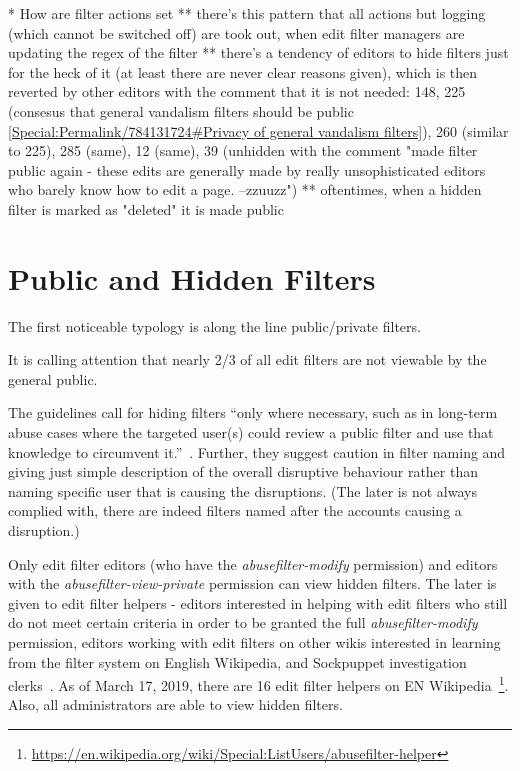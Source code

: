 * How are filter actions set
  ** there's this pattern that all actions but logging (which cannot be switched off) are took out, when edit filter managers are updating the regex of the filter
  ** there's a tendency of editors to hide filters just for the heck of it (at least there are never clear reasons given), which is then reverted by other editors with the comment that it is not needed: 148, 225 (consesus that general vandalism filters should be public \url{[Special:Permalink/784131724#Privacy of general vandalism filters]}), 260 (similar to 225), 285 (same), 12 (same), 39 (unhidden with the comment "made filter public again - these edits are generally made by really unsophisticated editors who barely know how to edit a page. --zzuuzz")
  ** oftentimes, when a hidden filter is marked as "deleted" it is made public



\section{Public and Hidden Filters}

The first noticeable typology is along the line public/private filters.

It is calling attention that nearly 2/3 of all edit filters are not viewable by the general public.

The guidelines call for hiding filters ``only where necessary, such as in long-term abuse cases where the targeted user(s) could review a public filter and use that knowledge to circumvent it.''~\cite{Wikipedia:EditFilter}.
Further, they suggest caution in filter naming and giving just simple description of the overall disruptive behaviour rather than naming specific user that is causing the disruptions.
(The later is not always complied with, there are indeed filters named after the accounts causing a disruption.)

Only edit filter editors (who have the \emph{abusefilter-modify} permission) and editors with the \emph{abusefilter-view-private} permission can view hidden filters.
The later is given to edit filter helpers - editors interested in helping with edit filters who still do not meet certain criteria in order to be granted the full \emph{abusefilter-modify} permission, editors working with edit filters on other wikis interested in learning from the filter system on English Wikipedia, and Sockpuppet investigation clerks~\cite{Wikipedia:EditFilterHelper}.
As of March 17, 2019, there are 16 edit filter helpers on EN Wikipedia~\footnote{\url{https://en.wikipedia.org/wiki/Special:ListUsers/abusefilter-helper}}.
Also, all administrators are able to view hidden filters.

